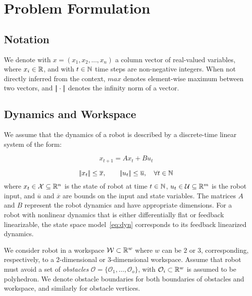 \section{Problem Formulation}

\subsection{Notation}

We denote with $x = (x_1, x_2, ..., x_n)$ a column vector of real-valued variables, where $x_i \in {\mathbb{R}}$,
and with $t \in {\mathbb{N}}$ time steps are non-negative integers. 
When not directly inferred from the context, $max$ denotes element-wise maximum between two vectors, 
and $|\!|\cdot|\!|$ denotes the infinity norm of a vector.


\subsection{Dynamics and Workspace}

We assume that the dynamics of a robot is described by a discrete-time linear system of the form:

\begin{equation}
    \label{eq:dyn}    
    x_{t+1} = A x_{t} + B u_{t} 
\end{equation}

\begin{equation}
    \label{eq:ulimit}    
    |\!|x_t|\!| \le \overline{x}, \qquad |\!|u_t|\!| \le \overline{u}, \quad \forall t \in {\mathbb{N}}
\end{equation}
where $x_t \in \mathcal{X} \subseteq {\mathbb{R}}^{n}$ is the state of robot at time $t \in {\mathbb{N}}$, 
$u_t \in \mathcal{U} \subseteq {\mathbb{R}}^{m}$ is the robot input,
and $\overline{u}$ and $\overline{x}$ are bounds on the input and state variables. 
The matrices $A$ and $B$ represent the robot dynamics and have appropriate dimensions. 
For a robot with nonlinear dynamics that is either differentially flat or feedback linearizable, 
the state space model~\eqref{eq:dyn} corresponds to its feedback linearized dynamics.

We consider robot in a workspace ${\mathcal{W}} \subset {\mathbb{R}}^{w}$ where $w$ can be $2$ or $3$, 
corresponding,  respectively, to a $2$-dimensional or $3$-dimensional workspace. 
Assume that robot must avoid a set of \emph{obstacles} $\mathcal{O} = \{\mathcal{O}_1, \ldots, \mathcal{O}_o\}$, 
with $\mathcal{O}_i \subset {\mathbb{R}}^w$ is assumed to be polyhedron.
We denote obstacle boundaries for both boundaries of obstacles and workspace, and similarly for obstacle vertices. 




